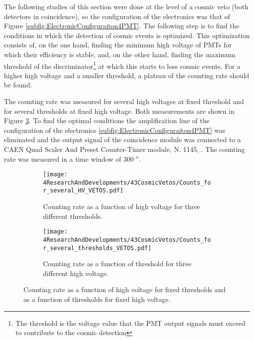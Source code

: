 The following studies of this section were done at the level of a cosmic veto (both detectors in coincidence), so the configuration of the electronics was that of Figure \ref{subfig:ElectronicConfiguraiton4PMT}. The following step is to find the conditions in which the detection of cosmic events is optimized. This optimization consists of, on the one hand, finding the minimum high voltage of PMTs for which their efficiency is stable, and, on the other hand, finding the maximum threshold of the discriminator\footnote{The threshold is the voltage value that the PMT output signals must exceed to contribute to the cosmic detection} at which this starts to loss cosmic events. For a higher high voltage and a smaller threshold, a plateau of the counting rate should be found.

The counting rate was measured for several high voltages at fixed threshold and for several thresholds at fixed high voltage. Both measurements are shown in Figure \ref{fig:HVandThresholdsPLateaus}. To find the optimal conditions the amplification line of the configuration of the electronics \ref{subfig:ElectronicConfiguraiton4PMT} was eliminated and the output signal of the coincidence module was connected to a CAEN Quad Scaler And Preset Counter-Timer module, N. 1145, \cite{ScalerDataSheet}. The counting rate was measured in a time window of $300~\second$.

\begin{figure}
\centering
    \begin{subfigure}[b]{0.8\textwidth}
    \centering
    \texttt{[image: 4ResearchAndDevelopments/43CosmicVetos/Counts\_for\_several\_HV\_VETOS.pdf]}  
    \caption{Counting rate as a function of high voltage for three different thresholds.\label{subfig:HVPLateauVetos}}
    \end{subfigure}
    \hfill
    \begin{subfigure}[b]{0.8\textwidth}
    \centering
    \texttt{[image: 4ResearchAndDevelopments/43CosmicVetos/Counts\_for\_several\_thresholds\_VETOS.pdf]}  
    \caption{Counting rate as a function of threshold for three different high voltage.\label{subfig:ThresholdsPlateau}}
    \end{subfigure}
 \caption{Counting rate as a function of high voltage for fixed thresholds and as a function of thresholds for fixed high voltage.}
 \label{fig:HVandThresholdsPLateaus}
\end{figure}


